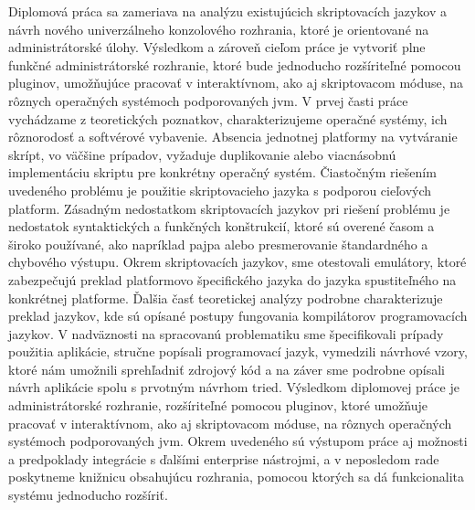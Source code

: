 \indent  Diplomová práca sa zameriava na analýzu existujúcich skriptovacích jazykov a návrh nového univerzálneho konzolového rozhrania, ktoré je orientované na administrátorské úlohy. Výsledkom a zároveň cieľom práce je vytvoriť plne funkčné administrátorské rozhranie, ktoré bude jednoducho rozšíriteľné pomocou pluginov, umožňujúce pracovať v interaktívnom, ako aj skriptovacom móduse, na rôznych operačných systémoch podporovaných \acrshort{jvm}.
\newline
\indent  V prvej časti práce vychádzame z teoretických poznatkov, charakterizujeme operačné systémy, ich rôznorodosť a softvérové vybavenie. Absencia jednotnej platformy na vytváranie skrípt, vo väčšine prípadov, vyžaduje duplikovanie alebo viacnásobnú implementáciu skriptu pre konkrétny operačný systém. Čiastočným riešením uvedeného problému je použitie skriptovacieho jazyka s podporou cieľových platform. Zásadným nedostatkom skriptovacích jazykov pri riešení problému je nedostatok syntaktických a funkčných konštrukcií, ktoré sú overené časom a široko používané, ako napríklad pajpa alebo presmerovanie štandardného a chybového výstupu. Okrem skriptovacích jazykov, sme otestovali emulátory, ktoré zabezpečujú preklad platformovo špecifického jazyka do jazyka spustiteľného na konkrétnej platforme. Ďalšia časť teoretickej analýzy podrobne charakterizuje preklad jazykov, kde sú opísané postupy fungovania kompilátorov programovacích jazykov. V nadväznosti na spracovanú problematiku sme špecifikovali prípady použitia aplikácie, stručne popísali programovací jazyk, vymedzili návrhové vzory, ktoré nám umožnili sprehľadniť zdrojový kód a na záver sme podrobne opísali návrh aplikácie spolu s prvotným návrhom tried. 
\newline
\indent Výsledkom diplomovej práce je administrátorské rozhranie, rozšíriteľné pomocou pluginov, ktoré umožňuje pracovať v interaktívnom, ako aj skriptovacom móduse, na rôznych operačných systémoch podporovaných \acrshort{jvm}. Okrem uvedeného sú výstupom práce aj možnosti a predpoklady integrácie s ďalšími enterprise nástrojmi, a v neposledom rade poskytneme knižnicu obsahujúcu rozhrania, pomocou ktorých sa dá funkcionalita systému jednoducho rozšíriť.